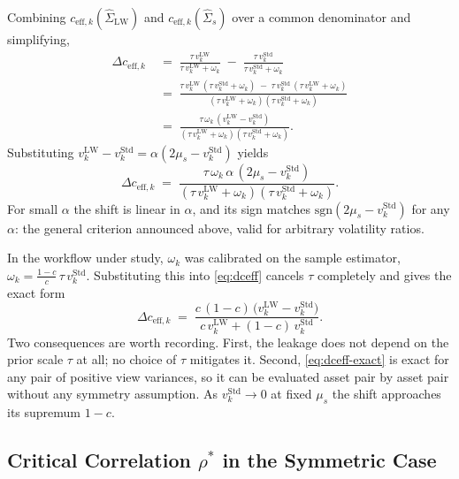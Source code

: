 \documentclass[a4paper,11pt]{article}
\theoremstyle{plain}
\theoremstyle{definition}
\newcommand{\Std}{\mathrm{Std}}
\newcommand{\LW}{\mathrm{LW}}
\newcommand{\eff}{\mathrm{eff}}
\begin{document}
Combining $c_{\eff,k}(\hat\Sigma_{\LW})$ and $c_{\eff,k}(\hat\Sigma_s)$
over a common denominator and simplifying,
\begin{align*}
  \Delta c_{\eff,k}
  \;&=\; \frac{\tau\,v_k^\LW}{\tau\,v_k^\LW + \omega_k}
        \;-\; \frac{\tau\,v_k^\Std}{\tau\,v_k^\Std + \omega_k}\\
  \;&=\; \frac{\tau\,v_k^\LW\,(\tau\,v_k^\Std + \omega_k) \;-\; \tau\,v_k^\Std\,(\tau\,v_k^\LW + \omega_k)}
              {(\tau\,v_k^\LW + \omega_k)(\tau\,v_k^\Std + \omega_k)}\\
  \;&=\; \frac{\tau\,\omega_k\,(v_k^\LW - v_k^\Std)}
              {(\tau\,v_k^\LW + \omega_k)(\tau\,v_k^\Std + \omega_k)}.
\end{align*}
Substituting $v_k^\LW - v_k^\Std = \alpha(2\mu_s - v_k^\Std)$ yields
\begin{equation}
\label{eq:dceff}
  \Delta c_{\eff,k}
  \;=\;
  \frac{\tau\,\omega_k\,\alpha\,(2\mu_s - v_k^\Std)}
       {(\tau\,v_k^\LW + \omega_k)(\tau\,v_k^\Std + \omega_k)}.
\end{equation}
For small $\alpha$ the shift is linear in $\alpha$, and its sign matches
$\mathrm{sgn}(2\mu_s - v_k^\Std)$ for any $\alpha$: the general criterion
announced above, valid for arbitrary volatility ratios.

In the workflow under study, $\omega_k$ was calibrated on the sample
estimator, $\omega_k = \tfrac{1-c}{c}\,\tau\,v_k^\Std$. Substituting
this into \eqref{eq:dceff} cancels $\tau$ completely and gives the exact
form
\begin{equation}
\label{eq:dceff-exact}
  \Delta c_{\eff,k}
  \;=\;
  \frac{c\,(1-c)\,\bigl(v_k^\LW - v_k^\Std\bigr)}
       {c\,v_k^\LW + (1-c)\,v_k^\Std}.
\end{equation}
Two consequences are worth recording. First, the leakage does not depend
on the prior scale $\tau$ at all; no choice of $\tau$ mitigates it.
Second, \eqref{eq:dceff-exact} is exact for any pair of positive view
variances, so it can be evaluated asset pair by asset pair without any
symmetry assumption. As $v_k^\Std \to 0$ at fixed $\mu_s$ the shift
approaches its supremum $1-c$.

\subsection{Critical Correlation $\rho^*$ in the Symmetric Case}
\label{sec:rho-star}
\end{document}
